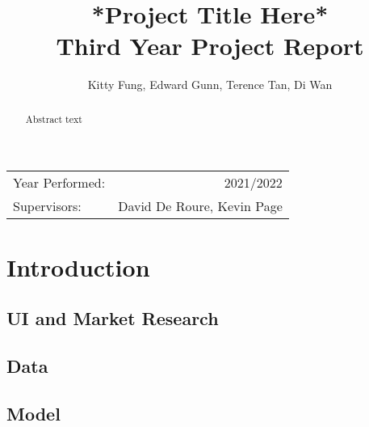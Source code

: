 \documentclass[11pt]{report}
\title{*Project Title Here* \\ Third Year Project Report} %
\author{Kitty Fung, Edward Gunn, Terence Tan, Di Wan} %
\date{} %
\begin{document}
\maketitle %

\begin{center}
\begin{tabular}{l r}
Year Performed: & 2021/2022 \\ %
Supervisors: & David De Roure, Kevin Page %
\end{tabular}
\end{center}

\begin{abstract}
Abstract text
\end{abstract}


\chapter{Introduction}


\section{UI and Market Research}


\section{Data}


\section{Model}
\end{document}
